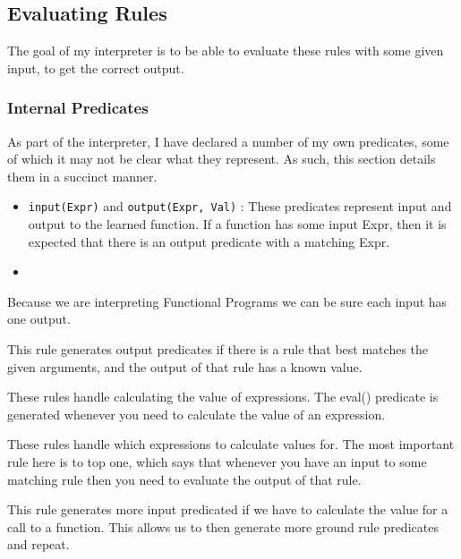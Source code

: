 \subsection{Evaluating Rules}

The goal of my interpreter is to be able to evaluate these rules with some given input, to get the correct output.

\subsubsection{Internal Predicates}
As part of the interpreter, I have declared a number of my own predicates, some of which it may not be clear what they represent. As such, this section details them in a succinct manner.
 
\begin{itemize}
\item \lstinline{input(Expr)} and \lstinline{output(Expr, Val)} : These predicates represent input and output to the learned function. If a function has some input Expr, then it is expected that there is an output predicate with a matching Expr.
\item 
\end{itemize}

Because we are interpreting Functional Programs we can be sure each input has one output.



This rule generates output predicates if there is a rule that best matches the given arguments, and the output of that rule has a known value.



These rules handle calculating the value of expressions. The eval() predicate is generated whenever you need to calculate the value of an expression.



These rules handle which expressions to calculate values for. The most important rule here is to top one, which says that whenever you have an input to some matching rule then you need to evaluate the output of that rule.



This rule generates more input predicated if we have to calculate the value for a call to a function. This allows us to then generate more ground rule predicates and repeat.

